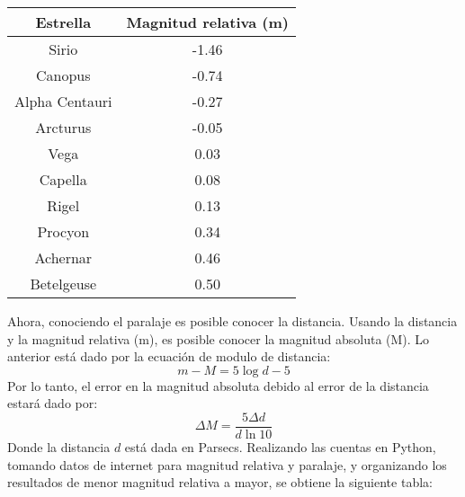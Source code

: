 \documentclass[12pt]{article}
\begin{document}
\begin{table}[h]
\centering
	\begin{tabular}{|c|c| }
	\hline
Estrella & Magnitud relativa (m) \\ \hline
Sirio & -1.46 \\ \hline
Canopus & -0.74 \\ \hline
Alpha Centauri & -0.27 \\ \hline
Arcturus & -0.05 \\ \hline
Vega & 0.03 \\ \hline
Capella & 0.08 \\ \hline
Rigel & 0.13 \\ \hline
Procyon & 0.34 \\ \hline
Achernar & 0.46 \\ \hline
Betelgeuse & 0.50 \\ \hline
	\end{tabular}
\end{table}
\vspace{1mm}




Ahora, conociendo el paralaje es posible conocer la distancia. Usando la distancia y la magnitud relativa (m), es posible conocer la magnitud absoluta (M). Lo anterior está dado por la ecuación de modulo de distancia:
\begin{equation}
m - M = 5 \log{d} - 5
\end{equation}
Por lo tanto, el error en la magnitud absoluta debido al error de la distancia estará dado por:
\begin{equation}
\Delta M = \frac{5 \Delta d}{d \ln{10}}
\end{equation}
Donde la distancia $d$ está dada en Parsecs. Realizando las cuentas en Python, tomando datos de internet para magnitud relativa y paralaje, y organizando los resultados de menor magnitud relativa a mayor, se obtiene la siguiente tabla:
\end{document}
